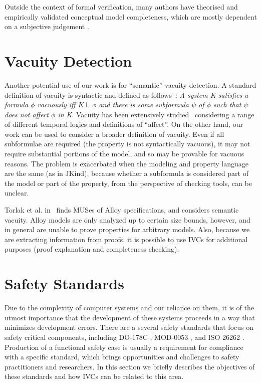 Outside the context of formal verification, many authors have theorised and empirically validated conceptual model completeness, which are mostly dependent on a subjective judgement \cite{drechsler2012completeness, firesmith2005your, chang2007finding,katta2013investigating, zowghi2003three, espana2009evaluating}.



\section{Vacuity Detection}
Another potential use of our work is for ``semantic'' vacuity detection.  A standard definition of vacuity is syntactic and defined as follows~\cite{Kupferman:2006:SCF}: {\em A system K satisfies a formula $\phi$ vacuously iff $K \vdash \phi$ and there is some subformula $\psi$ of $\phi$ such that $\psi$ does not affect $\phi$ in K}.  Vacuity has been extensively studied~\cite{Gurfinkel:2012:RVB,Chockler2008,DBLP:Ben-DavidK13,Kupferman:2006:SCF,Chockler:2007,Beer1997} considering a range of different temporal logics and definitions of ``affect''.  On the other hand, our work can be used to consider a broader definition of vacuity.  Even if all subformulae are required (the property is not syntactically vacuous), it may not require substantial portions of the model, and so may be provable for vacuous reasons.  The problem is exacerbated when the modeling and property language are the same (as in JKind), because whether a subformula is considered part of the model or part of the property, from the perspective of checking tools, can be unclear.

Torlak et al. in~\cite{Torlak08:cores} finds MUSes of Alloy
specifications, and considers semantic vacuity.
 Alloy models are only analyzed up to certain
size bounds, however, and in general are unable to prove properties
for arbitrary models. Also, because we are extracting information from
proofs, it is possible to use IVCs for additional purposes (proof
explanation and completeness checking).

\section{Safety Standards}
Due to the complexity of computer systems and our reliance on them, it is of the utmost importance that the development of these systems proceeds in a way that minimizes development errors. There are a several safety standards that focus on safety critical components, including DO-178C \cite{DO178C}, MOD-0053 \cite{standard2007standard}, and ISO 26262 \cite{iso201126262}. Production of a functional safety case is usually a requirement for compliance with a specific standard, which brings opportunities and challenges to safety practitioners and researchers. In this section we briefly describes the objectives of these standards and how IVCs can be related to this area.

